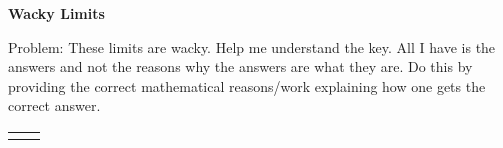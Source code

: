 \documentclass[letterpaper,11pt]{article}
\newif\ifsolutions
\newcommand{\fgraff}{
\begin{minipage}[l][.30\textwidth]{3 in}{
\begin{tikzpicture}
\begin{axis}[
   	xmin=-3.25, xmax=3.25,
	ymin=-2.25, ymax=2.25,
	major tick length={0},
	xtick={-3,-2,...,3}, ytick={-2,-1,...,2},
	line width=1pt, title={\textbf{Graph of $f$}},
 	axis lines=center, height=2 in, width=3 in, grid=major,
 	restrict y to domain=-2.25:2.25
	]
	\addplot [mark=*, black, smooth, very thick] plot coordinates {(-3,2)(-2,1)};
	\addplot [mark=*, black, smooth, very thick] plot coordinates {(-2,3)};
	\addplot [mark=*, black, smooth, very thick] plot coordinates {(-2,0)(-1,1)};
	\addplot [mark=*, black, smooth, very thick] plot coordinates {(-1,2)(1,2)};
	\addplot [mark=*, black, smooth, very thick] plot coordinates {(2,-1)(3,-1)};
    \addplot [black, smooth, very thick, samples=299, domain=1:2] {(x-1)^2};
    \addplot [black, only marks, very thick, mark=*, mark options={scale=1, fill=white}]
    coordinates{(1,0) (2,1) (-1,2) (-2,1) (-2,0)};
    \addplot [black, only marks, very thick, mark=*] coordinates{(-2,2)};
\end{axis}
\end{tikzpicture}
}
\end{minipage}}
\newcommand{\ggraff}{
\begin{minipage}[l][.30\textwidth]{3 in}{
\begin{tikzpicture}
\begin{axis}[
   	xmin=-3.25, xmax=3.25,
	ymin=-2.25, ymax=2.25,
	major tick length={0},
	xtick={-3,-2,...,3}, ytick={-2,-1,...,2},
	line width=1pt, title={\textbf{Graph of $g$}},
 	axis lines=center, height=2 in, width=3 in, grid=major,
 	restrict y to domain=-2.25:2.25
	]
	\addplot [mark=*, black, smooth, very thick] plot coordinates {(-3,-1)(-1,-1)};
	\addplot [mark=*, black, smooth, very thick] plot coordinates {(1,-1)(3,1)};
	\addplot [black, very thick, mark=*, mark options={scale=1, fill=white}] plot coordinates {(-1,-2)(1,-2)};
\end{axis}
\end{tikzpicture}
}
\end{minipage}}
\begin{document}

\ifsolutions
\noindent \textbf{Wacky Limits} \textcolor{blue}{ - Solutions}
\else
\noindent \textbf{Wacky Limits}
\fi

\noindent Problem: These limits are wacky. Help me understand the key. All I have is the answers and not the reasons why the answers are what they are. Do this by providing the correct mathematical reasons/work explaining how one gets the correct answer.

\begin{center}
\begin{tabular}{l r}
\fgraff & \ggraff
\end{tabular}
\end{center}

\vspace{-.3 in}

\ifsolutions
\textcolor{blue}{We will be using limit laws throughout these solutions. One quirk of the limit laws is that they can only be applied if the individual limits exist.
For example, the limit law equation
\[
  \lim_{x \to a} \dfrac{f(x)}{g(x)} = \frac{\lim\limits_{x \to a} f(x)}{\lim\limits_{x \to a} g(x)}
\]
is only true if both $\lim\limits_{x \to a} f(x)$ and $\lim\limits_{x \to a} g(x)$ exist and $\lim\limits_{x \to a} g(x)$ is not equal to $0$
(otherwise the fraction on the right-hand side doesn't make sense). Accordingly, when we use limit laws, we will use them provisionally. If all limits involved turn out to exist, the limit law will work, and we will have our answer. If they do not exist, the limit law equation will be nonsense and we will have to try something else.}
\fi
\end{document}
